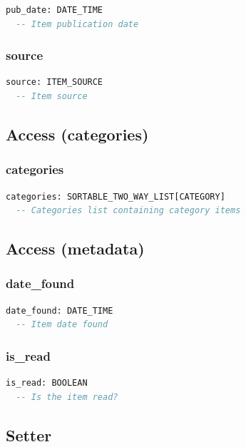 \begin{lstlisting}[language=Eiffel]
pub_date: DATE_TIME
  -- Item publication date
\end{lstlisting}

\subsubsection{source}

\begin{lstlisting}[language=Eiffel]
source: ITEM_SOURCE
  -- Item source
\end{lstlisting}


\subsection{Access (categories)}
\label{sec:item-access-categories}

\subsubsection{categories}

\begin{lstlisting}[language=Eiffel]
categories: SORTABLE_TWO_WAY_LIST[CATEGORY]
  -- Categories list containing category items
\end{lstlisting}

\subsection{Access (metadata)}
\label{sec:item-access-metadata}

\subsubsection{date\_found}

\begin{lstlisting}[language=Eiffel]
date_found: DATE_TIME
  -- Item date found
\end{lstlisting}

\subsubsection{is\_read}

\begin{lstlisting}[language=Eiffel]
is_read: BOOLEAN
  -- Is the item read?
\end{lstlisting}

\subsection{Setter}
\label{sec:item-setter}

